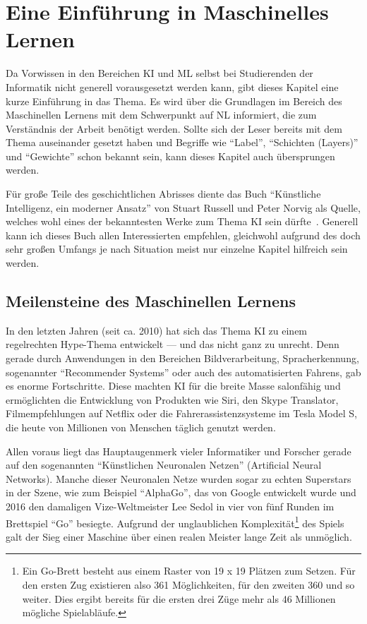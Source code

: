 ﻿\chapter{Eine Einführung in Maschinelles Lernen}
Da Vorwissen in den Bereichen \gls{KI} und \gls{ML} selbst bei Studierenden der Informatik nicht generell vorausgesetzt werden kann, gibt dieses Kapitel eine kurze Einführung in das Thema. Es wird über die Grundlagen im Bereich des Maschinellen Lernens mit dem Schwerpunkt auf \gls{NL} informiert, die zum Verständnis der Arbeit benötigt werden. Sollte sich der Leser bereits mit dem Thema auseinander gesetzt haben und Begriffe wie "`\gls{Label}"', "`Schichten (Layers)"' und "`Gewichte"' schon bekannt sein, kann dieses Kapitel auch übersprungen werden.

Für große Teile des geschichtlichen Abrisses diente das Buch "`Künstliche Intelligenz, ein moderner Ansatz"' von Stuart Russell und Peter Norvig als Quelle, welches wohl eines der bekanntesten Werke zum Thema \gls{KI} sein dürfte~\cite{Russell.2012}. Generell kann ich dieses Buch allen Interessierten empfehlen, gleichwohl aufgrund des doch sehr großen Umfangs je nach Situation meist nur einzelne Kapitel hilfreich sein werden.

\section{Meilensteine des Maschinellen Lernens} \label{sec:milestones}
In den letzten Jahren (seit ca. 2010) hat sich das Thema \gls{KI} zu einem regelrechten Hype-Thema entwickelt --- und das nicht ganz zu unrecht. Denn gerade durch Anwendungen in den Bereichen Bildverarbeitung, Spracherkennung, sogenannter "`Recommender Systems"' oder auch des automatisierten Fahrens, gab es enorme Fortschritte. Diese machten \gls{KI} für die breite Masse salonfähig und ermöglichten die Entwicklung von Produkten wie Siri, den Skype Translator, Filmempfehlungen auf Netflix oder die Fahrerassistenzsysteme im Tesla Model S, die heute von Millionen von Menschen täglich genutzt werden.

Allen voraus liegt das Hauptaugenmerk vieler Informatiker und Forscher gerade auf den sogenannten "`Künstlichen Neuronalen Netzen"' (Artificial Neural Networks). Manche dieser Neuronalen Netze wurden sogar zu echten Superstars in der Szene, wie zum Beispiel "`AlphaGo"', das von Google entwickelt wurde und 2016 den damaligen Vize-Weltmeister Lee Sedol in vier von fünf Runden im Brettspiel "`Go"' besiegte. Aufgrund der unglaublichen Komplexität\footnote{Ein Go-Brett besteht aus einem Raster von 19 x 19 Plätzen zum Setzen. Für den ersten Zug existieren also 361 Möglichkeiten, für den zweiten 360 und so weiter. Dies ergibt bereits für die ersten drei Züge mehr als 46 Millionen mögliche Spielabläufe.} des Spiels galt der Sieg einer Maschine über einen realen Meister lange Zeit als unmöglich.

